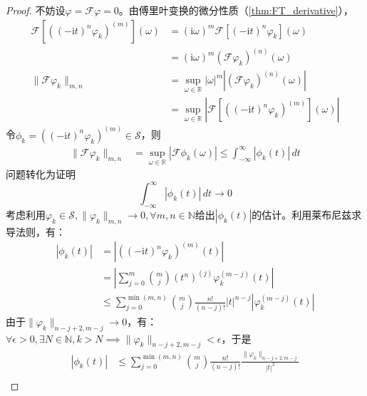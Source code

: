 \begin{proof}
    不妨设$\varphi=\mathcal{F} \varphi=0$。由傅里叶变换的微分性质（\cref{thm:FT_derivative}），
    \begin{align*}
        \mathcal{F}\left[\left((-\mathrm{i}t)^n\varphi_k\right)^{(m)}\right](\omega) & =(\mathrm{i}\omega)^m \mathcal{F}\left[(-\mathrm{i}t)^n \varphi_k\right](\omega)                            \\
                                                                                     & =(\mathrm{i}\omega)^m (\mathcal{F} \varphi_k)^{(n)}(\omega)                                                 \\
        \|\mathcal{F} \varphi_k\|_{m,n}                                              & =\sup_{\omega\in\mathbb{R} }|\omega|^m\left|(\mathcal{F} \varphi_k)^{(n)}(\omega)\right|                    \\
                                                                                     & =\sup_{\omega\in\mathbb{R} }\left|\mathcal{F}\left[((-\mathrm{i}t)^n \varphi_k)^{(m)}\right](\omega)\right|
    \end{align*}
    令$\phi_k=\left((-\mathrm{i}t)^n \varphi_k\right)^{(m)}\in\mathcal{S} $，则
    \begin{align*}
        \|\mathcal{F} \varphi_k\|_{m,n} & =\sup_{\omega\in\mathbb{R} }\left|\mathcal{F} \phi_k(\omega)\right|\leq \int_{-\infty}^{\infty}|\phi_k(t)|\,dt
    \end{align*}
    问题转化为证明\[\int_{-\infty}^{\infty}|\phi_k(t)|\,dt\to 0\]
    考虑利用$\varphi_k\in\mathcal{S} ,\|\varphi_k\|_{m,n}\to 0,\forall m,n\in\mathbb{N}$给出$|\phi_k(t)|$的估计。利用莱布尼兹求导法则，有：
    \begin{align*}
        |\phi_k(t)| & =\left|\left((-\mathrm{i}t)^n \varphi_k\right)^{(m)}(t)\right|                                     \\
                    & =\left|\sum_{j=0}^{m}\binom{m}{j}(t^n)^{(j)}\varphi_k^{(m-j)}(t)\right|                            \\
                    & \leq \sum_{j=0}^{\min(m,n)}\binom{m}{j}\frac{n!}{(n-j)!}|t|^{n-j}\left|\varphi_k^{(m-j)}(t)\right|
    \end{align*}
    由于$\|\varphi_k\|_{n-j+2,m-j}\to 0$，有：$\forall \epsilon>0,\exists N\in\mathbb{N},k>N\implies \|\varphi_k\|_{n-j+2,m-j}<\epsilon$，于是
    \begin{align*}
        |\phi_k(t)| & \leq \sum_{j=0}^{\min(m,n)}\binom{m}{j}\frac{n!}{(n-j)!}\frac{\|\varphi_k\|_{n-j+2,m-j}}{|t|^2} \\

\end{align*}
\end{proof}
